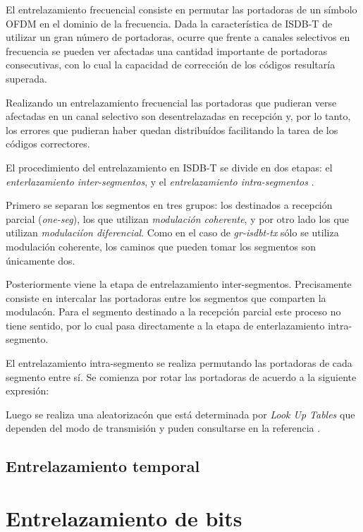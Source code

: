 El entrelazamiento frecuencial consiste en permutar las portadoras de un s\'imbolo OFDM en el dominio de la frecuencia. Dada la caracter\'istica de ISDB-T de utilizar un gran n\'umero de portadoras, ocurre que frente a canales selectivos en frecuencia se pueden ver afectadas una cantidad importante de portadoras consecutivas, con lo cual la capacidad de correcci\'on de los c\'odigos resultar\'ia superada.

Realizando un entrelazamiento frecuencial las portadoras que pudieran verse afectadas en un canal selectivo son desentrelazadas en recepci\'on y, por lo tanto, los errores que pudieran haber quedan distribu\'idos facilitando la tarea de los c\'odigos correctores.

El procedimiento del entrelazamiento en ISDB-T se divide en dos etapas: el \textit{enterlazamiento inter-segmentos}, y el \textit{entrelazamiento intra-segmentos }.

Primero se separan los segmentos en tres grupos: los destinados a recepci\'on parcial (\textit{one-seg}), los que utilizan \textit{modulaci\'on coherente}, y por otro lado los que utilizan \textit{modulaci\'ion diferencial}. Como en el caso de \textit{gr-isdbt-tx} s\'olo se utiliza modulaci\'on coherente, los caminos que pueden tomar los segmentos son \'unicamente dos.

Posteriormente viene la etapa de entrelazamiento inter-segmentos. Precisamente consiste en intercalar las portadoras entre los segmentos que comparten la modulac\'on. Para el segmento destinado a la recepci\'on parcial este proceso no tiene sentido, por lo cual pasa directamente a la etapa de enterlazamiento intra-segmento.

El entrelazamiento intra-segmento se realiza permutando las portadoras de cada segmento entre s\'i. Se comienza por rotar las portadoras de acuerdo a la siguiente expresi\'on:

Luego se realiza una aleatorizac\'on que est\'a determinada por \textit{Look Up Tables} que dependen del modo de transmisi\'on y puden consultarse en la referencia \cite{bb}.

\subsection{Entrelazamiento temporal}

\section{Entrelazamiento de bits}

